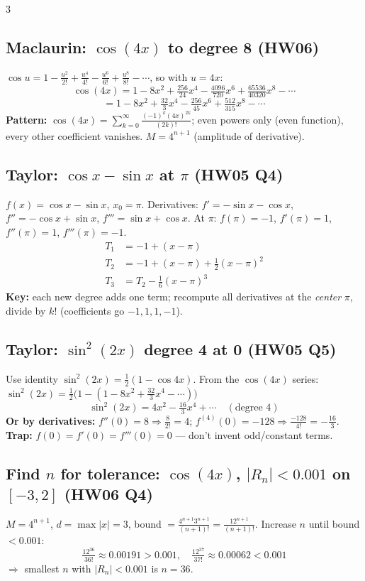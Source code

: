 \documentclass[9pt]{extarticle}
\newcommand{\hl}[1]{\textbf{\textcolor{BrickRed}{#1}}}
\begin{document}
\begin{multicols}{3}
\subsection{Maclaurin: $\cos(4x)$ to degree 8 (HW06)}
$\cos u=1-\tfrac{u^2}{2!}+\tfrac{u^4}{4!}-\tfrac{u^6}{6!}+\tfrac{u^8}{8!}-\cdots$, so with $u=4x$:
\begin{equation*}
\cos(4x)=1-8x^2+\tfrac{256}{24}x^4-\tfrac{4096}{720}x^6+\tfrac{65536}{40320}x^8-\cdots
\end{equation*}
\begin{equation*}
=1-8x^2+\tfrac{32}{3}x^4-\tfrac{256}{45}x^6+\tfrac{512}{315}x^8-\cdots
\end{equation*}
\hl{Pattern:} $\cos(4x)=\sum_{k=0}^{\infty}\tfrac{(-1)^k(4x)^{2k}}{(2k)!}$; even powers only (even function), every other coefficient vanishes. $M=4^{n+1}$ (amplitude of derivative).

\subsection{Taylor: $\cos x-\sin x$ at $\pi$ (HW05 Q4)}
$f(x)=\cos x-\sin x$, $x_0=\pi$. Derivatives: $f'=-\sin x-\cos x$, $f''=-\cos x+\sin x$, $f'''=\sin x+\cos x$. At $\pi$: $f(\pi)=-1$, $f'(\pi)=1$, $f''(\pi)=1$, $f'''(\pi)=-1$.
\begin{align*}
T_1&=-1+(x-\pi)\\
T_2&=-1+(x-\pi)+\tfrac12(x-\pi)^2\\
T_3&=T_2-\tfrac16(x-\pi)^3
\end{align*}
\hl{Key:} each new degree adds one term; recompute all derivatives at the \emph{center} $\pi$, divide by $k!$ (coefficients go $-1,1,1,-1$).

\subsection{Taylor: $\sin^2(2x)$ degree 4 at 0 (HW05 Q5)}
Use identity $\sin^2(2x)=\tfrac12(1-\cos 4x)$. From the $\cos(4x)$ series: $\sin^2(2x)=\tfrac12\big(1-(1-8x^2+\tfrac{32}{3}x^4-\cdots)\big)$
\begin{equation*}
\sin^2(2x)=4x^2-\tfrac{16}{3}x^4+\cdots \quad (\text{degree }4)
\end{equation*}
\hl{Or by derivatives:} $f''(0)=8\Rightarrow\tfrac8{2!}=4$; $f^{(4)}(0)=-128\Rightarrow\tfrac{-128}{4!}=-\tfrac{16}{3}$. \hl{Trap:} $f(0)=f'(0)=f'''(0)=0$ — don't invent odd/constant terms.

\subsection{Find $n$ for tolerance: $\cos(4x)$, $|R_n|<0.001$ on $[-3,2]$ (HW06 Q4)}
$M=4^{n+1}$, $d=\max|x|=3$, bound $=\tfrac{4^{n+1}3^{n+1}}{(n+1)!}=\tfrac{12^{n+1}}{(n+1)!}$. Increase $n$ until bound $<0.001$:
\begin{equation*}
\tfrac{12^{36}}{36!}\approx0.00191>0.001,\quad \tfrac{12^{37}}{37!}\approx0.00062<0.001
\end{equation*}
$\Rightarrow$ smallest $n$ with $|R_n|<0.001$ is \hl{$n=36$}.


\end{multicols}
\end{document}
